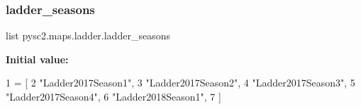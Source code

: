 \mbox{\label{namespacepysc2_1_1maps_1_1ladder_a44ba49ec554cb34eb14d42605de8bb79}} 
\subsubsection{\texorpdfstring{ladder\+\_\+seasons}{ladder\_seasons}}
{\footnotesize\ttfamily list pysc2.\+maps.\+ladder.\+ladder\+\_\+seasons}

{\bfseries Initial value\+:}
\begin{DoxyCode}
1 =  [
2     \textcolor{stringliteral}{"Ladder2017Season1"},
3     \textcolor{stringliteral}{"Ladder2017Season2"},
4     \textcolor{stringliteral}{"Ladder2017Season3"},
5     \textcolor{stringliteral}{"Ladder2017Season4"},
6     \textcolor{stringliteral}{"Ladder2018Season1"},
7 ]
\end{DoxyCode}
